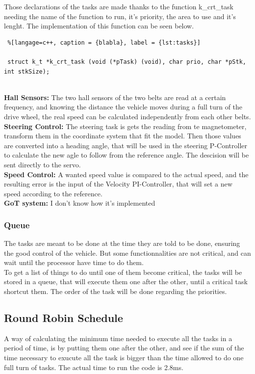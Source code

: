 Those declarations of the tasks are made thanks to the function k\_crt\_task needing the name of the function to run, it's priority, the area to use and it's lenght. The implementation of this function can be seen below.


\begin{lstlisting} %[langage=c++, caption = {blabla}, label = {lst:tasks}]

 struct k_t *k_crt_task (void (*pTask) (void), char prio, char *pStk, int stkSize);
 
\end{lstlisting}

\textbf{Hall Sensors:}
The two hall sensors of the two belts are read at a certain frequency, and knowing the distance the vehicle moves during a full turn of the drive wheel, the real speed can be calculated independently from each other belts.\\

\textbf{Steering Control:}
The steering task is gets the reading from te magnetometer, transform them in the coordinate system that fit the model. Then those values are converted into a heading angle, that will be used in the steering P-Controller to calculate the new agle to follow from the reference angle. The descision will be sent directly to the servo.\\

\textbf{Speed Control:}
A wanted speed value is compared to the actual speed, and the resulting error is the input of the Velocity PI-Controller, that will set a new speed according to the reference.\\

\textbf{GoT system:}
I don't know how it's implemented



\subsubsection{Queue}
The tasks are meant to be done at the time they are told to be done, ensuring the good control of the vehicle. But some functionnalities are not critical, and can wait until the processor have time to do them.\\
To get a list of things to do until one of them become critical, the tasks will be stored in a queue, that will execute them one after the other, until a critical task shortcut them. The order of the task will be done regarding the priorities.


\subsection{Round Robin Schedule}
A way of calculating the minimum time needed to execute all the tasks in a period of time, is by putting them one after the other, and see if the sum of the time necessary to exucute all the task is bigger than the time allowed to do one full turn of tasks. The actual time to run the code is 2.8ms.

